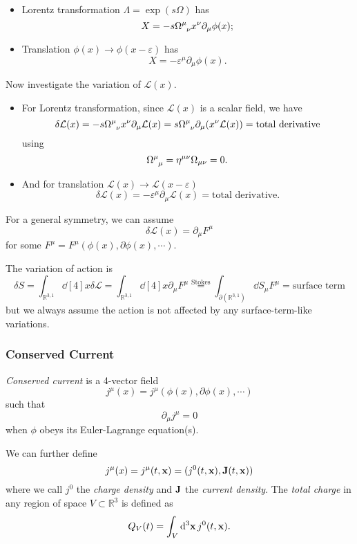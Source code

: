 \documentclass[a4paper,11pt]{article}
\begin{document}
	\begin{ex}
		\
		\begin{itemize}
			\item Lorentz transformation $\Lambda = \exp(s \Omega)$ has \[
				X = - s \Omega\indices{^\mu _\nu} x^\nu \partial_\mu \phi(x);
			\]
			\item Translation $\phi(x) \to \phi(x - \varepsilon)$ has \[
				X = - \varepsilon^\mu \partial_\mu \phi(x).
			\]
		\end{itemize}
	\end{ex}

	Now investigate the variation of $\mathcal{L}(x)$. 
	\begin{itemize}
		\item For Lorentz transformation, since $\mathcal{L}(x)$ is a scalar field, we have \[
			\delta \mathcal{L}(x) = -s \Omega\indices{^\mu _\nu} x^\nu \partial_\mu \mathcal{L}(x) = s \Omega\indices{^\mu _\nu} \partial_\mu (x^\nu \mathcal{L}(x)) = \text{total derivative}
		\]
		using 
		\[
			\Omega\indices{^\mu_\mu} = \eta ^{\mu \nu} \Omega _{\mu \nu} = 0.
		\]
		\item And for translation $\mathcal{L}(x) \to \mathcal{L}(x - \varepsilon)$ \[
			\delta \mathcal{L}(x) = - \varepsilon^\mu \partial_\mu \mathcal{L}(x) = \text{total derivative}.
		\]
	\end{itemize}

	For a general symmetry, we can assume
	\begin{equation}
		\delta \mathcal{L}(x) = \partial_\mu F^\mu
		\label{eq:1.7.1}
	\end{equation}
	for some $F^\mu = F^\mu(\phi(x), \partial \phi(x), \cdots)$.
	
	The variation of action is
	\[
		\delta S = \int _{\mathbb{R}^{3,1}} \dd[4]{x} \delta \mathcal{L} = \int _{\mathbb{R}^{3,1}} \dd[4]{x} \partial_\mu F^\mu \overset{\text{Stokes}}{=} \int _{\partial(\mathbb{R}^{3,1})} \dd{S_\mu} F^\mu = \text{surface term}
	\]
	but we always assume the action is not affected by any surface-term-like variations.

	\subsubsection{Conserved Current}

	\begin{defi}
		\emph{Conserved current} is a 4-vector field
		\[
			j^\mu (x) = j^\mu(\phi(x), \partial \phi(x),\cdots)
		\]
		such that
		\begin{equation}
			\partial_\mu j^\mu = 0
			\label{eq:1.7.2}
		\end{equation}
		when $\phi$ obeys its Euler-Lagrange equation(s).

		We can further define
		\[
			j^\mu (x) = j^\mu (t, \vb x) = (j^0 (t,\vb x), \vb J(t, \vb x))
		\]
		where we call $j^0$ the \emph{charge density} and $\vb J$ the \emph{current density}. The \emph{total charge} in any region of space $V \subset \mathbb{R}^3$ is defined as
		\[
			Q_V (t) = \int_V \dd[3]{\vb x} j^0(t, \vb x).
		\]
	\end{defi}
	
\end{document}
